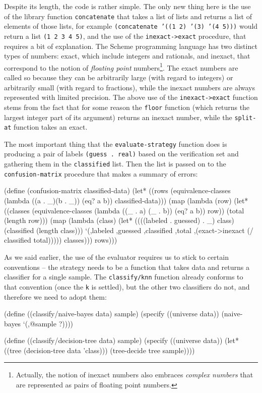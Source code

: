 Despite its length, the code is rather simple. The only new
thing here is the use of the library function \texttt{concatenate}
that takes a list of lists and returns a list of elements of
those lists, for example \texttt{(concatenate '((1 2) '(3) '(4 5)))}
would return a list \texttt{(1 2 3 4 5)}, and the use of the
\texttt{inexact->exact} procedure, that requires a bit of
explanation. The Scheme programming language has two distinct
types of numbers: exact, which include integers and rationals,
and inexact, that correspond to the notion of \textit{floating
point} numbers\footnote{Actually, the notion of inexact numbers
also embraces \textit{complex numbers} that are represented
as pairs of floating point numbers.}. The exact numbers are called
so because they can be arbitrarily large (with regard to integers)
or arbitrarily small (with regard to fractions), while the
inexact numbers are always represented with limited precision.
The above use of the \texttt{inexact->exact} function stems from
the fact that for some reason the \texttt{floor} function
(which returns the largest integer part of its argument)
returns an inexact number, while the \texttt{split-at} function
takes an exact.

The most important thing that the \texttt{evaluate-strategy}
function does is producing a pair of labels \texttt{(guess . real)}
based on the verification set and gathering them in the
\texttt{classified} list. Then the list is passed on to the
\texttt{confusion-matrix} procedure that makes a summary of
errors:

\begin{Snippet}
(define (confusion-matrix classified-data)
  (let* ((rows (equivalence-classes (lambda ((a . _)(b . _))
				      (eq? a b))
				    classified-data)))
    (map (lambda (row)
	   (let* ((classes (equivalence-classes
			    (lambda ((_ . a) (_ . b))
			      (eq? a b))
			    row))
		  (total (length row)))
	     (map (lambda (class)
		    (let* ((((labeled . guessed) . _) class)
			  (classified (length class)))
		      `(,labeled ,guessed ,classified ,total 
				 ,(exact->inexact 
				   (/ classified total)))))
		  classes)))
	 rows)))
\end{Snippet}

As we said earlier, the use of the evaluator requires us
to stick to certain conventions -- the strategy needs to
be a function that takes data and returns a classifier
for a single sample. The \texttt{classify/knn} function
already conforms to that convention (once the \texttt{k}
is settled), but the other two classifiers do not, and
therefore we need to adopt them:
\begin{Snippet}
(define ((classify/naive-bayes data) sample)
  (specify ((universe data))
    (naive-bayes `(,@sample ?))))
\end{Snippet}
\begin{Snippet}
(define ((classify/decision-tree data) sample)
  (specify ((universe data))
    (let* ((tree (decision-tree data 'class)))
      (tree-decide tree sample))))
\end{Snippet}

